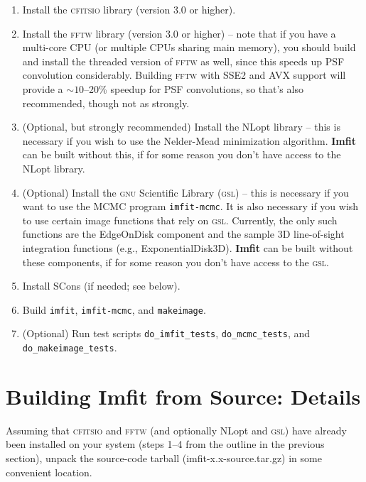 \documentclass[10pt,a4paper,article]{memoir}
\newcommand{\Imfit}{\textbf{Imfit}}
\newcommand{\imfitprog}{\texttt{imfit}}
\newcommand{\imfitmcmc}{\texttt{imfit-mcmc}}
\newcommand{\makeimage}{\texttt{makeimage}}
\begin{document}
\begin{enumerate}
\item Install the \textsc{cfitsio} library (version 3.0 or higher).

\item Install the \textsc{fftw} library (version 3.0 or higher) -- note
that if you have a multi-core CPU (or multiple CPUs sharing main
memory), you should build and install the threaded version of
\textsc{fftw} as well, since this speeds up PSF convolution
considerably. Building \textsc{fftw} with SSE2 and AVX support will
provide a $\sim 10$--20\% speedup for PSF convolutions, so that's also
recommended, though not as strongly.

\item (Optional, but strongly recommended) Install the NLopt library --
this is necessary if you wish to use the Nelder-Mead minimization
algorithm. \Imfit{} can be built without this, if for some reason
you don't have access to the NLopt library.

\item (Optional) Install the \textsc{gnu} Scientific Library
(\textsc{gsl}) -- this is necessary if you want to use the MCMC program
\imfitmcmc. It is also necessary if you wish to use certain image
functions that rely on \textsc{gsl}.  Currently, the only such functions
are the EdgeOnDisk component and the sample 3D line-of-sight integration
functions (e.g., ExponentialDisk3D). \Imfit{} can be built without these
components, if for some reason you don't have access to the \textsc{gsl}.

\item Install SCons (if needed; see below).

\item Build \imfitprog, \imfitmcmc, and \makeimage.

\item (Optional) Run test scripts \texttt{do\_imfit\_tests}, \texttt{do\_mcmc\_tests},
and \texttt{do\_makeimage\_tests}.

\end{enumerate}



\section{Building \Imfit{} from Source: Details}\label{sec:build}

Assuming that \textsc{cfitsio} and \textsc{fftw} (and optionally NLopt
and \textsc{gsl}) have already been installed on your system (steps 1--4
from the outline in the previous section), unpack the source-code
tarball (imfit-x.x-source.tar.gz) in some convenient location.
\end{document}
